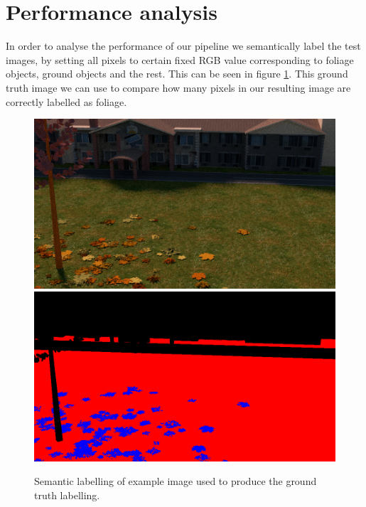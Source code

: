 \documentclass[fleqn,10pt]{SelfArx} %
\begin{document}


\section{Performance analysis}

In order to analyse the performance of our pipeline we semantically label the test images, by setting all pixels to certain fixed RGB value corresponding to foliage objects, ground objects and the rest. This can be seen in figure \ref{fig:ExImGT}. This ground truth image we can use to compare how many pixels in our resulting image are correctly labelled as foliage.

\begin{figure}[ht]\centering
\includegraphics[width=0.45\linewidth]{Figures/im50001.png}
\includegraphics[width=0.45\linewidth]{Figures/im_anno50001.png}
\caption{Semantic labelling of example image used to produce the ground truth labelling.}
\label{fig:ExImGT}
\end{figure}
\end{document}

